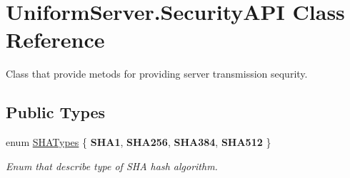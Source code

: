 \hypertarget{class_uniform_server_1_1_security_a_p_i}{}\section{Uniform\+Server.\+Security\+A\+PI Class Reference}
\label{class_uniform_server_1_1_security_a_p_i}


Class that provide metods for providing server transmission sequrity.  


\subsection*{Public Types}
\begin{DoxyCompactItemize}
\item 
enum \mbox{\hyperlink{class_uniform_server_1_1_security_a_p_i_a0013616bf69cff8555e697c0c4960240}{S\+H\+A\+Types}} \{ {\bfseries S\+H\+A1}, 
{\bfseries S\+H\+A256}, 
{\bfseries S\+H\+A384}, 
{\bfseries S\+H\+A512}
 \}
\begin{DoxyCompactList}\small\item\em Enum that describe type of S\+HA hash algorithm. \end{DoxyCompactList}\end{DoxyCompactItemize}

